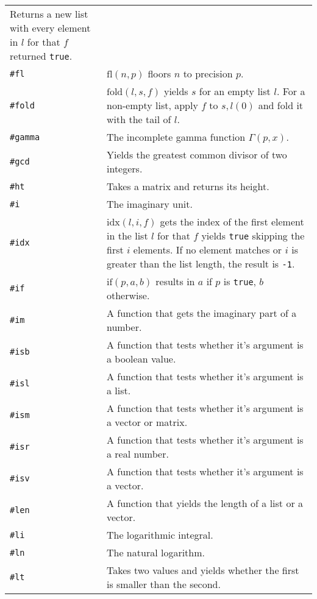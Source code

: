 \documentclass[10pt]{article}
\begin{document}
\begin{longtable}{p{}p{}}
                          Returns a new list with every element in $ l $ for that $ f $ returned \verb|true|. \\
        \verb|#fl|      & $ \mathrm{fl}(n,p) $ floors $ n $ to precision $ p $. \\
        \verb|#fold|    & $ \mathrm{fold}(l,s,f) $ yields $ s $ for an empty list $ l $.
                          For a non-empty list, apply $ f $ to $ s, l(0) $ and fold it with the tail of $ l $. \\
        \verb|#gamma|   & The incomplete gamma function $ \Gamma(p, x) $. \\
        \verb|#gcd|     & Yields the greatest common divisor of two integers. \\
        \verb|#ht|      & Takes a matrix and returns its height. \\
        \verb|#i|       & The imaginary unit. \\
        \verb|#idx|     & $ \mathrm{idx}(l,i,f) $ gets the index of the first element in the list $ l $ for that $ f $ yields \verb|true| skipping the first $ i $ elements.
                          If no element matches or $ i $ is greater than the list length, the result is \verb|-1|. \\
        \verb|#if|      & $ \mathrm{if}(p,a,b) $ results in $ a $ if $ p $ is \verb|true|, $ b $ otherwise. \\
        \verb|#im|      & A function that gets the imaginary part of a number. \\
        \verb|#isb|     & A function that tests whether it's argument is a boolean value. \\
        \verb|#isl|     & A function that tests whether it's argument is a list. \\
        \verb|#ism|     & A function that tests whether it's argument is a vector or matrix. \\
        \verb|#isr|     & A function that tests whether it's argument is a real number. \\
        \verb|#isv|     & A function that tests whether it's argument is a vector. \\
        \verb|#len|     & A function that yields the length of a list or a vector. \\
        \verb|#li|      & The logarithmic integral. \\
        \verb|#ln|      & The natural logarithm. \\
        \verb|#lt|      & Takes two values and yields whether the first is smaller than the second.

\end{longtable}
\end{document}
